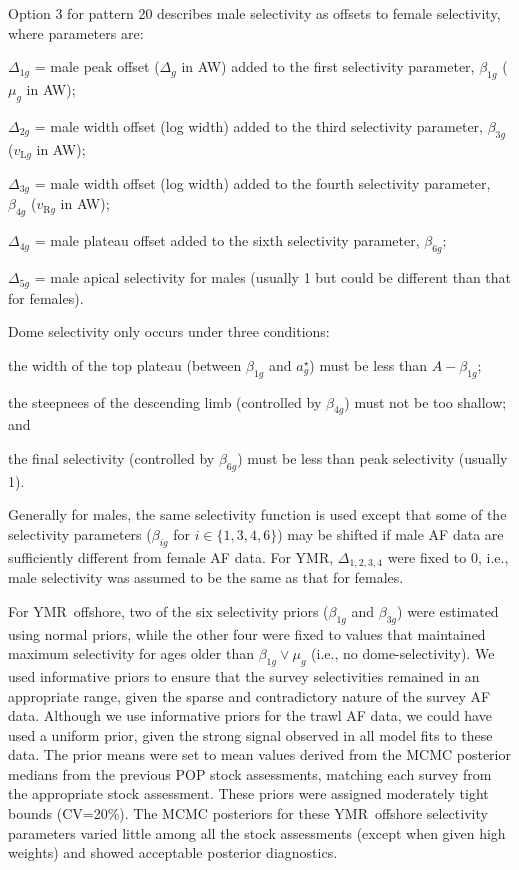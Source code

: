 \documentclass[11pt]{book}
\newcommand{\pc}{\%}
\begin{document}
Option 3 for pattern 20 describes male selectivity as offsets to female selectivity, where parameters are:
\begin{enumerate_csas}{}{}
\item $\Delta_{1g}$ = male peak offset ($\Delta_g$ in AW) added to the first selectivity parameter, $\beta_{1g}$ ($\mu_g$ in AW);
\item $\Delta_{2g}$ = male width offset (log width) added to the third selectivity parameter, $\beta_{3g}$ ($v_{\mathrm{L}g}$ in AW);
\item $\Delta_{3g}$ = male width offset (log width) added to the fourth selectivity parameter, $\beta_{4g}$ ($v_{\mathrm{R}g}$ in AW);
\item $\Delta_{4g}$ = male plateau offset added to the sixth selectivity parameter, $\beta_{6g}$;
\item $\Delta_{5g}$ = male apical selectivity for males (usually 1 but could be different than that for females).
\end{enumerate_csas}

Dome selectivity only occurs under three conditions:\\
\begin{itemize_csas}{}{}
  \item the width of the top plateau (between $\beta_{1g}$ and $a_g^{\star}$) must be less than $A - \beta_{1g}$;
  \item the steepnees of the descending limb (controlled by $\beta_{4g}$) must not be too shallow; and 
  \item the final selectivity (controlled by $\beta_{6g}$) must be less than peak selectivity (usually 1).
\end{itemize_csas}
Generally for males, the same selectivity function is used except that some of the selectivity parameters ($\beta_{ig}$ for $i\in \{1,3,4,6\}$) may be shifted if male AF data are sufficiently different from female AF data.
For YMR, $\Delta_{1,2,3,4}$ were  fixed to 0, i.e., male selectivity was assumed to be the same as that for females.

For YMR~offshore, two of the six selectivity priors ($\beta_{1g}$ and $\beta_{3g}$) were estimated using normal priors, while the other four were fixed to values that maintained maximum selectivity for ages older than $\beta_{1g} \vee \mu_g$ (i.e., no dome-selectivity).
We used informative priors to ensure that the survey selectivities remained in an appropriate range, given the sparse and contradictory nature of the survey AF data.
Although we use informative priors for the trawl AF data, we could have used a uniform prior, given the strong signal observed in all model fits to these data.
The prior means were set to mean values derived from the MCMC posterior medians from the previous POP stock assessments, matching each survey from the appropriate stock assessment.
These priors were assigned moderately tight bounds (CV=20\pc).
The MCMC posteriors for these YMR~offshore selectivity parameters varied little among all the stock assessments (except when given high weights) and showed acceptable posterior diagnostics.
\end{document}
